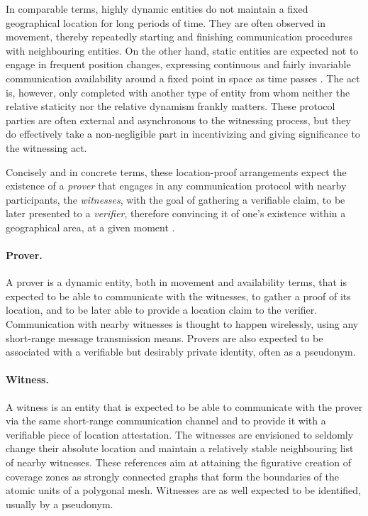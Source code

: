 In comparable terms, highly dynamic entities do not maintain a fixed geographical location for long periods of time. They are often observed in movement, thereby repeatedly starting and finishing communication procedures with neighbouring entities. On the other hand, static entities are expected not to engage in frequent position changes, expressing continuous and fairly invariable communication availability around a fixed point in space as time passes \cite{nasrulin2018robust}. The act is, however, only completed with another type of entity from whom neither the relative staticity nor the relative dynamism frankly matters. These protocol parties are often external and asynchronous to the witnessing process, but they do effectively take a non-negligible part in incentivizing and giving significance to the witnessing act. 

Concisely and in concrete terms, these location-proof arrangements expect the existence of a \emph{prover} that engages in any communication protocol with nearby participants, the \emph{witnesses}, with the goal of gathering a verifiable \pol claim, to be later presented to a \emph{verifier}, therefore convincing it of one's existence within a geographical area, at a given moment \cite{dupin2018location}.

\paragraph{Prover.} A prover is a dynamic entity, both in movement and availability terms, that is expected to be able to communicate with the witnesses, to gather a proof of its location, and to be later able to provide a location claim to the verifier. Communication with nearby witnesses is thought to happen wirelessly, using any short-range message transmission means. Provers are also expected to be associated with a verifiable but desirably private identity, often as a pseudonym.

\paragraph{Witness.} A witness is an entity that is expected to be able to communicate with the prover via the same short-range communication channel and to provide it with a verifiable piece of location attestation. The witnesses are envisioned to seldomly change their absolute location and maintain a relatively stable neighbouring list of nearby witnesses. These references aim at attaining the figurative creation of coverage zones as strongly connected graphs that form the boundaries of the atomic units of a polygonal mesh. Witnesses are as well expected to be identified, usually by a pseudonym.

